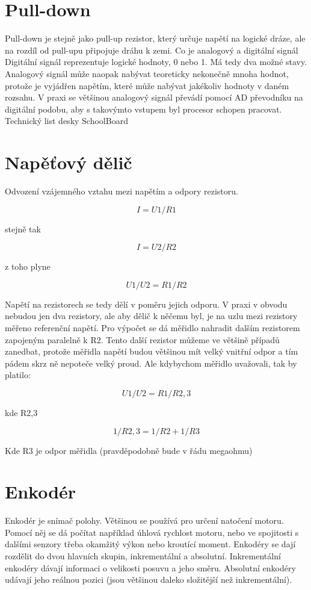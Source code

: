 \documentclass{template/socthesis}
\begin{document}
	\section*{Pull-down}
	Pull-down je stejně jako pull-up rezistor, který určuje napětí na logické dráze, ale na rozdíl od
	pull-upu připojuje dráhu k zemi.
	Co je analogový a digitální signál
	Digitální signál reprezentuje logické hodnoty, 0 nebo 1. Má tedy dva možné stavy. Analogový signál může naopak nabývat teoreticky nekonečně mnoha hodnot, protože je vyjádřen napětím, které může nabývat jakékoliv hodnoty v daném rozsahu. V praxi se většinou analogový signál převádí pomocí AD převodníku na digitální podobu, aby s takovýmto vstupem byl procesor schopen pracovat.
	Technický list desky SchoolBoard
	
	\section*{Napěťový dělič}
	Odvození vzájemného vztahu mezi napětím a odpory rezistoru.
	\begin{listedequation}[h]
		$$I=U{1}/R{1}$$
		\caption{stejně tak}
		$$I=U{2}/R{2}$$ 
		\caption{z toho plyne}
		$$U{1}/U{2} =R{1}/R{2}$$
		\label{eq:hrnekeq}
	\end{listedequation}
	 		
	Napětí na rezistorech se tedy dělí v poměru jejich odporu. V praxi v obvodu nebudou jen dva rezistory, ale aby dělič k něčemu byl, je na uzlu mezi rezistory měřeno referenční napětí. Pro výpočet se dá měřidlo nahradit dalším rezistorem zapojeným paralelně k R2. Tento další rezistor můžeme ve většině případů zanedbat, protože měřidla napětí budou většinou mít velký vnitřní odpor a tím pádem skrz ně nepoteče velký proud. Ale kdybychom měřidlo uvažovali, tak by platilo:
	
	\begin{listedequation}[h]
		$$U{1}/U{2} =R{1}/R{2,3}$$
		\caption{kde R{2,3}}
		$$1/R{2,3} =1/R{2} +1/R{3}$$ 
		\caption{Kde R3 je odpor měřidla (pravděpodobně bude v řádu megaohmu)}
		\label{eq:hrnekeq}
	\end{listedequation}
	
	\section*{Enkodér}
	Enkodér je snímač polohy. Většinou se používá pro určení natočení motoru. Pomocí něj se dá počítat například úhlová rychlost motoru, nebo ve spojitosti s dalšími senzory třeba okamžitý výkon nebo kroutící moment. 
	Enkodéry se dají rozdělit do dvou hlavních skupin, inkrementální a absolutní. 
	Inkrementální enkodéry dávají informaci o velikosti posuvu a jeho směru.
	Absolutní enkodéry udávají jeho reálnou pozici (jsou většinou daleko složitější než inkrementální).
	
\end{document}
